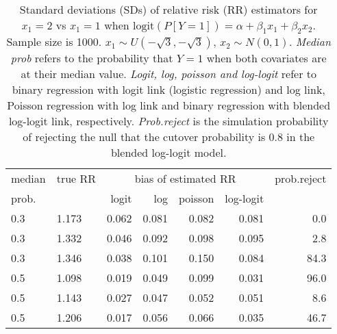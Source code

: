 \documentclass[12pt,a4paper]{article}
\begin{document}
\begin{table}[H] 
\small\sf\centering 
\caption{Standard deviations (SDs) of relative risk (RR) estimators for $x_1=2$ vs $x_1=1$ when $\mbox{logit}(P[Y=1])=\alpha+\beta_1 x_1 + \beta_2 x_2$. Sample size is 1000. $x_1 \sim $$U(-\sqrt{3},-\sqrt{3})$, $x_2 \sim N(0,1)$. {\it Median prob} refers to the probability that $Y=1$ when both covariates are at their median value. {\it Logit, log, poisson and log-logit} refer to binary regression with logit link (logistic regression) and log link, Poisson regression with log link and binary regression with blended log-logit link, respectively. {\it Prob.reject} is the simulation probability of rejecting the null that the cutover probability is $0.8$ in the blended log-logit model.} 
\begin{tabular}{llrrrrr} 
\toprule 
median & true RR & \multicolumn{4}{c}{bias of estimated RR} & prob.reject \\ 
prob. & & logit & log & poisson & log-logit  & \\ \midrule 
0.3 & 1.173 & 0.062 & 0.081 & 0.082 & 0.081 &  0.0 \\  
0.3 & 1.332 & 0.046 & 0.092 & 0.098 & 0.095 &  2.8 \\  
0.3 & 1.346 & 0.038 & 0.101 & 0.150 & 0.084 & 84.3 \\  
0.5 & 1.098 & 0.019 & 0.049 & 0.099 & 0.031 & 96.0 \\  
0.5 & 1.143 & 0.027 & 0.047 & 0.052 & 0.051 &  8.6 \\  
0.5 & 1.206 & 0.017 & 0.056 & 0.066 & 0.035 & 46.7 \\  
\bottomrule 
\end{tabular} 
\end{table} 
\end{document}
